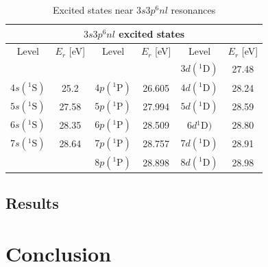 \begin{table}[]
	\centering
	\begin{tabular}{|cc|cc|cc|}
		\hline \hline
		\multicolumn{6}{|c|}{$3s3p^6nl$ excited states}                                               \\ \hline
		Level        & $E_r$ {[}eV{]} & Level        & $E_r$ {[}eV{]} & Level        & $E_r$ {[}eV{]} \\ \hline
		&                &              &                & $3d({}^1\mathrm{D})$ & 27.48          \\
		$4s( {}^1\mathrm{S})$ & 25.2           & $4p({}^1\mathrm{P})$ & 26.605         & $4d({}^1\mathrm{D})$   & 28.24          \\
		$5s( {}^1\mathrm{S})$ & 27.58          & $5p({}^1\mathrm{P})$ & 27.994         & $5d({}^1\mathrm{D})$ & 28.59          \\
		$6s( {}^1\mathrm{S})$ & 28.35          & $6p({}^1\mathrm{P})$ & 28.509         & $6d{}^1\mathrm{D})$ & 28.80          \\
		$7s( {}^1\mathrm{S})$ & 28.64          & $7p({}^1\mathrm{P})$ & 28.757         & $7d({}^1\mathrm{D})$   & 28.91          \\
		&                & $8p({}^1\mathrm{P})$ & 28.898         & $8d({}^1\mathrm{D})$ & 28.98          \\ \hline \hline
	\end{tabular}
	\caption{Excited states near $3s3p^6nl$ resonances}
	\label{tab:all_states}
\end{table}




\subsection{Results}
\label{sec:ATS_ar_results}

\section{Conclusion}
\label{sec:ATS_conclusion}

